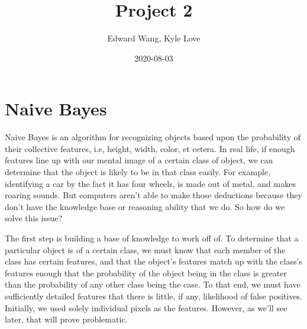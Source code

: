 \documentclass{article}
\title{Project 2}
\date{2020-08-03}
\author{Edward Wang, Kyle Love}
\begin{document}
\maketitle

\section{Naive Bayes}
Naive Bayes is an algorithm for recognizing objects based upon the probability of their collective features, i.e, height, width, color, et cetera. In real life, if enough features line up with our mental image of a certain class of object, we can determine that the object is likely to be in that class easily. For example, identifying a car by the fact it has four wheels, is made out of metal, and makes roaring sounds. But computers aren't able to make those deductions because they don't have the knowledge base or reasoning ability that we do. So how do we solve this issue?

The first step is building a base of knowledge to work off of. To determine that a particular object is of a certain class, we must know that each member of the class has certain features, and that the object's features match up with the class's features enough that the probability of the object being in the class is greater than the probability of any other class being the case. To that end, we must have sufficiently detailed features that there is little, if any, likelihood of false positives. Initially, we used solely individual pixels as the features. However, as we'll see later, that will prove problematic.
\end{document}
